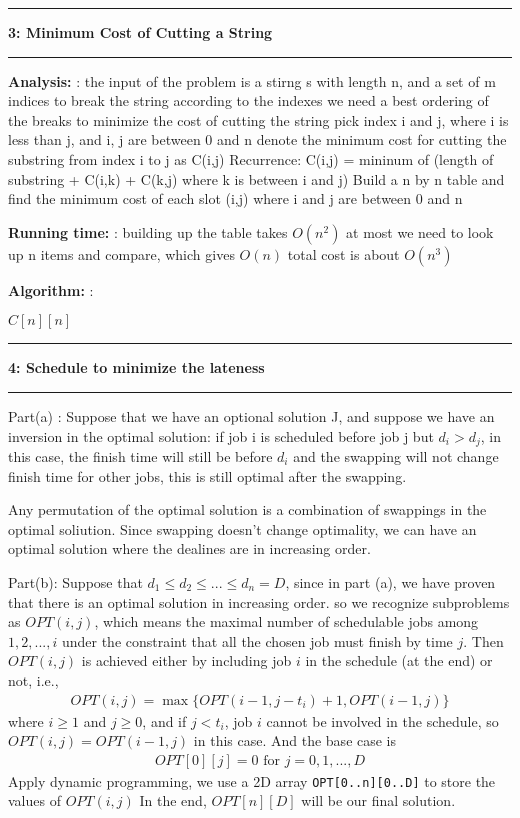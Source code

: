\documentclass[11pt]{article}
\newcommand\question[2]{\vspace{.25in}\hrule\textbf{#1: #2}\vspace{.5em}\hrule\vspace{.10in}}
\newcommand\analysis{\vspace{.10in}\textbf{Analysis: }}
\newcommand\algorithm{\vspace{.10in}\textbf{Algorithm: }}
\newcommand\runtime{\vspace{.10in}\textbf{Running time: }}
\begin{document}
\question{3}{Minimum Cost of Cutting a String}

\analysis:
the input of the problem is a stirng s with length n, and a set of m indices to break the string according to the indexes 
we need a best ordering of the breaks to minimize the cost of cutting the string 
pick index i and j,  where i is less than j, and i, j are between 0 and n 
denote the minimum cost for cutting the substring from index i to j as C(i,j)
Recurrence: C(i,j) = mininum of  (length of substring + C(i,k) + C(k,j) where k is between i and j)
Build a n by n table and find the minimum cost of each slot (i,j) where i and j are between 0 and n 

\runtime:
building up the table takes $O(n^2)$
at most we need to look up n items and compare, which gives $O(n)$
total cost is about $O(n^3)$

\algorithm:
\begin{algorithmic}
\State $C[n][n]$ 

\end{algorithmic}


\question{4}{Schedule to minimize the lateness}
Part(a) : Suppose that we have an optional solution J, and suppose we have an inversion in the optimal solution:
if job i is scheduled before job j but \begin{math} d_i > d_j \end{math}, in this case, the finish time will still be before \begin{math}d_i \end{math}
and the swapping will not change finish time for other jobs, this is still optimal after the swapping.

Any permutation of the optimal solution is a combination of swappings in the optimal soliution. Since swapping doesn't change 
optimality, we can have an optimal solution where the dealines are in increasing order. 

Part(b): 
Suppose that $d_1\le d_2\le...\le d_n=D$, 
since in part (a), we have proven that there is an optimal solution in increasing order. 
so we recognize subproblems as $OPT(i,j)$, which means the maximal number of schedulable jobs among $1, 2, ..., i$ under the constraint that all the chosen job must finish by time $j$. Then $OPT(i,j)$ is achieved either by including job $i$ in the schedule (at the end) or not, i.e.,
\begin{align}
OPT(i,j) = \max{\{OPT(i-1,j-t_i)+1, OPT(i-1,j)\}}
\end{align}
where $i\ge 1$ and $j\ge 0$, and if $j < t_i$, job $i$ cannot be involved in the schedule, so $OPT(i,j) = OPT(i-1,j)$ in this case. And the base case is
\begin{align}
OPT[0][j] = 0 \textrm{ for } j=0, 1, ..., D
\end{align}
Apply dynamic programming, we use a 2D array \texttt{OPT[0..n][0..D]} to store the values of $OPT(i,j)$
In the end, $OPT[n][D]$ will be our final solution.
\end{document}

